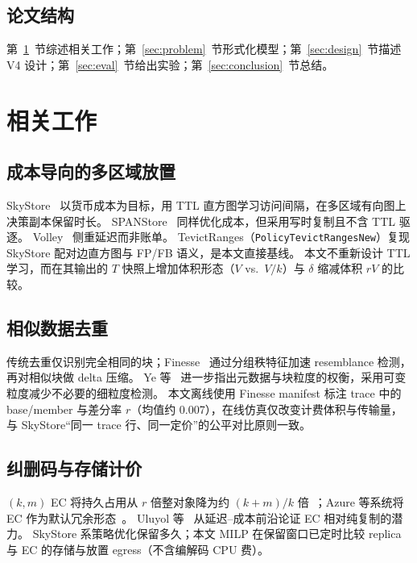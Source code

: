 \documentclass[conference]{IEEEtran}
\begin{document}
\subsection{论文结构}

第~\ref{sec:related}~节综述相关工作；第~\ref{sec:problem}~节形式化模型；第~\ref{sec:design}~节描述 V4 设计；第~\ref{sec:eval}~节给出实验；第~\ref{sec:conclusion}~节总结。

\section{相关工作}
\label{sec:related}

\subsection{成本导向的多区域放置}

SkyStore~\cite{skystore2025} 以货币成本为目标，用 TTL 直方图学习访问间隔，在多区域有向图上决策副本保留时长。
SPANStore~\cite{spanstore2013} 同样优化成本，但采用写时复制且不含 TTL 驱逐。
Volley~\cite{volley2010} 侧重延迟而非账单。
TevictRanges（\texttt{PolicyTevictRangesNew}）复现 SkyStore 配对边直方图与 FP/FB 语义，是本文直接基线。
本文不重新设计 TTL 学习，而在其输出的 $T$ 快照上增加体积形态（$V$ vs.\ $V/k$）与 $\delta$ 缩减体积 $rV$ 的比较。

\subsection{相似数据去重}

传统去重仅识别完全相同的块；Finesse~\cite{finesse} 通过分组秩特征加速 resemblance 检测，再对相似块做 delta 压缩。
Ye 等~\cite{ye2021fast} 进一步指出元数据与块粒度的权衡，采用可变粒度减少不必要的细粒度检测。
本文离线使用 Finesse manifest 标注 trace 中的 base/member 与差分率 $r$（均值约 0.007），在线仿真仅改变计费体积与传输量，与 SkyStore``同一 trace 行、同一定价''的公平对比原则一致。

\subsection{纠删码与存储计价}

$(k,m)$ EC 将持久占用从 $r$ 倍整对象降为约 $(k{+}m)/k$ 倍~\cite{plank2013}；Azure 等系统将 EC 作为默认冗余形态~\cite{azure_ec2012}。
Uluyol 等~\cite{uluyol2020} 从延迟--成本前沿论证 EC 相对纯复制的潜力。
SkyStore 系策略优化保留多久；本文 MILP 在保留窗口已定时比较 replica 与 EC 的存储与放置 egress（不含编解码 CPU 费）。
\end{document}

